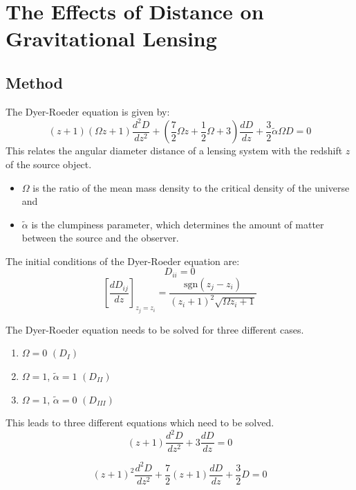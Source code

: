 \documentclass[a4paper]{IEEEtran}
\begin{document}

\section{The Effects of Distance on Gravitational Lensing}
\subsection{Method} 
The Dyer-Roeder equation is given by:
\begin{equation}
    (z+1)(\Omega z + 1) \frac{d^2D}{dz^2} + 
    \left( \frac{7}{2}\Omega z + \frac{1}{2}\Omega + 3 \right) \frac{dD}{dz} + 
    \frac{3}{2} \tilde{\alpha} \Omega D = 0
\end{equation}
This relates the angular diameter distance of a lensing system with the
redshift $z$ of the source object.
\begin{itemize}
    \item $\Omega$ is the ratio of the mean mass density to the critical
          density of the universe and
    \item $\tilde{\alpha}$ is the clumpiness parameter, which determines
          the amount of matter between the source and the observer.
\end{itemize}
The initial conditions of the Dyer-Roeder equation are:
\begin{equation}
    D_{ii} = 0
\end{equation}
\begin{equation}
    \left[ \frac{dD_{ij}}{dz} \right]_{z_j = z_i} =
         \frac{\mathrm{sgn} (z_j - z_i)}{(z_i + 1)^2 \sqrt{\Omega z_i + 1} }
\end{equation}

The Dyer-Roeder equation needs to be solved for three different cases.
\begin{enumerate}
    \item  $\Omega = 0$ $(D_{I})$
    \item  $\Omega = 1$, $\tilde{\alpha} = 1$ $(D_{II})$
    \item  $\Omega = 1$, $\tilde{\alpha} = 0$ $(D_{III})$
\end{enumerate}

This leads to three different equations which need to be solved.
\begin{equation}
    (z+1)\frac{d^2D}{dz^2} + 3 \frac{dD}{dz} = 0
\end{equation}

\begin{equation}
    (z+1)^2 \frac{d^2D}{dz^2} + \frac{7}{2}(z+1)\frac{dD}{dz} + \frac{3}{2}D = 0
\end{equation}
\end{document}
